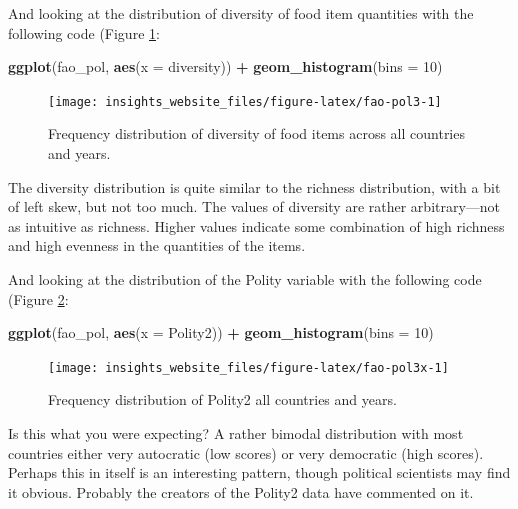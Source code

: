 \documentclass[]{book}
\newenvironment{Shaded}{\begin{snugshade}}{\end{snugshade}}
\newcommand{\DataTypeTok}[1]{\textcolor[rgb]{0.13,0.29,0.53}{#1}}
\newcommand{\DecValTok}[1]{\textcolor[rgb]{0.00,0.00,0.81}{#1}}
\newcommand{\KeywordTok}[1]{\textcolor[rgb]{0.13,0.29,0.53}{\textbf{#1}}}
\newcommand{\NormalTok}[1]{#1}
\newcommand{\OperatorTok}[1]{\textcolor[rgb]{0.81,0.36,0.00}{\textbf{#1}}}
\newcommand{\StringTok}[1]{\textcolor[rgb]{0.31,0.60,0.02}{#1}}
\begin{document}
And looking at the distribution of diversity of food item quantities with the following code (Figure \ref{fig:fao-pol3}:

\begin{Shaded}
\begin{Highlighting}[]
\KeywordTok{ggplot}\NormalTok{(fao_pol, }\KeywordTok{aes}\NormalTok{(}\DataTypeTok{x =}\NormalTok{ diversity)) }\OperatorTok{+}
\StringTok{  }\KeywordTok{geom_histogram}\NormalTok{(}\DataTypeTok{bins =} \DecValTok{10}\NormalTok{)}
\end{Highlighting}
\end{Shaded}

\begin{figure}

{\centering \texttt{[image: insights\_website\_files/figure-latex/fao-pol3-1]} 

}

\caption{Frequency distribution of diversity of food items across all countries and years.}\label{fig:fao-pol3}
\end{figure}

The diversity distribution is quite similar to the richness distribution, with a bit of left skew, but not too much. The values of diversity are rather arbitrary---not as intuitive as richness. Higher values indicate some combination of high richness and high evenness in the quantities of the items.

And looking at the distribution of the Polity variable with the following code (Figure \ref{fig:fao-pol3x}:

\begin{Shaded}
\begin{Highlighting}[]
\KeywordTok{ggplot}\NormalTok{(fao_pol, }\KeywordTok{aes}\NormalTok{(}\DataTypeTok{x =}\NormalTok{ Polity2)) }\OperatorTok{+}
\StringTok{  }\KeywordTok{geom_histogram}\NormalTok{(}\DataTypeTok{bins =} \DecValTok{10}\NormalTok{)}
\end{Highlighting}
\end{Shaded}

\begin{figure}

{\centering \texttt{[image: insights\_website\_files/figure-latex/fao-pol3x-1]} 

}

\caption{Frequency distribution of Polity2 all countries and years.}\label{fig:fao-pol3x}
\end{figure}

Is this what you were expecting? A rather bimodal distribution with most countries either very autocratic (low scores) or very democratic (high scores). Perhaps this in itself is an interesting pattern, though political scientists may find it obvious. Probably the creators of the Polity2 data have commented on it.
\end{document}
